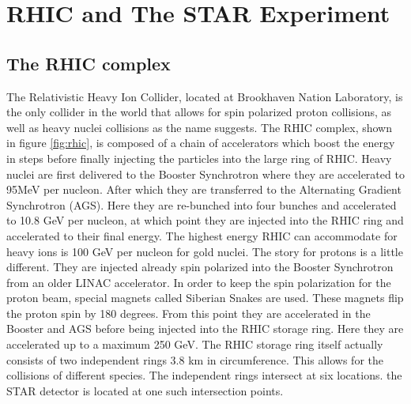 \documentclass[abstract = on,listof=totoc, bibliography=totoc]{scrreprt}
\begin{document}
\chapter{RHIC and The STAR Experiment}

\section{The RHIC complex}
The Relativistic Heavy Ion Collider, located at Brookhaven Nation Laboratory, is the only collider in the world that allows for spin polarized proton collisions, as well as heavy nuclei collisions as the name suggests. The RHIC complex, shown in figure \ref{fig:rhic}, is composed of a chain of accelerators which boost the energy in steps before finally injecting the particles into the large ring of RHIC. Heavy nuclei are first delivered to the Booster Synchrotron where they are accelerated to 95MeV per nucleon. After which they are transferred to the Alternating Gradient Synchrotron (AGS). Here they are re-bunched into four bunches and accelerated to 10.8 GeV per nucleon, at which point they are injected into the RHIC ring and accelerated to their final energy. The highest energy RHIC can accommodate for heavy ions is 100 GeV per nucleon for gold nuclei. 
The story for protons is a little different. They are injected already spin polarized into the Booster Synchrotron from an older LINAC accelerator. In order to keep the spin polarization for the proton beam, special magnets called Siberian Snakes are used. These magnets flip the proton spin by 180 degrees. From this point they are accelerated in the Booster and AGS before being injected into the RHIC storage ring. Here they are accelerated up to a maximum 250 GeV. 
The RHIC storage ring itself actually consists of two independent rings 3.8 km in circumference. This allows for the collisions of different species. The independent rings intersect at six locations. the STAR detector is located at one such intersection points\cite{RHICoverview}.
\end{document}
